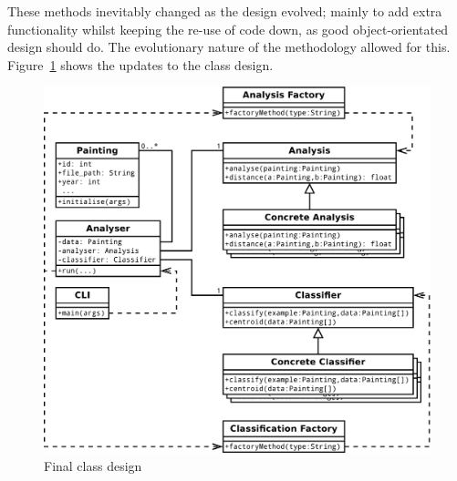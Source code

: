 These methods inevitably changed as the design evolved; mainly to add extra functionality whilst
keeping the re-use of code down, as good object-orientated design should do. The evolutionary 
nature of the methodology allowed for this. Figure~\ref{fig:uml-final} shows the updates to the
class design.

\begin{figure}[h]
\centering
\includegraphics[width=\textwidth]{img/uml-final}
\caption{Final class design}\label{fig:uml-final}
\end{figure}

